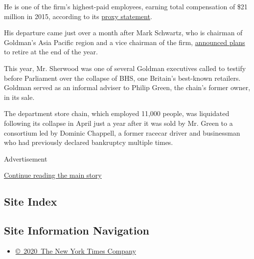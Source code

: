He is one of the firm's highest-paid employees, earning total
compensation of \$21 million in 2015, according to its
\href{http://www.goldmansachs.com/investor-relations/financials/current/proxy-statements/2016-proxy-statement-pdf.pdf}{proxy
statement}.

His departure came just over a month after Mark Schwartz, who is
chairman of Goldman's Asia Pacific region and a vice chairman of the
firm,
\href{http://www.nytimes.com/2016/10/18/business/dealbook/goldman-sachss-asia-pacific-chairman-to-retire.html?rref=collection\%2Ftimestopic\%2FGoldman\%20Sachs\%20Group\&action=click\&contentCollection=business\&region=stream\&module=stream_unit\&version=latest\&contentPlacement=5\&pgtype=collection}{announced
plans} to retire at the end of the year.

This year, Mr. Sherwood was one of several Goldman executives called to
testify before Parliament over the collapse of BHS, one Britain's
best-known retailers. Goldman served as an informal adviser to Philip
Green, the chain's former owner, in its sale.

The department store chain, which employed 11,000 people, was liquidated
following its collapse in April just a year after it was sold by Mr.
Green to a consortium led by Dominic Chappell, a former racecar driver
and businessman who had previously declared bankruptcy multiple times.

Advertisement

\protect\hyperlink{after-bottom}{Continue reading the main story}

\hypertarget{site-index}{%
\subsection{Site Index}\label{site-index}}

\hypertarget{site-information-navigation}{%
\subsection{Site Information
Navigation}\label{site-information-navigation}}

\begin{itemize}
\tightlist
\item
  \href{https://help.nytimes.com/hc/en-us/articles/115014792127-Copyright-notice}{©~2020~The
  New York Times Company}
\end{itemize}

